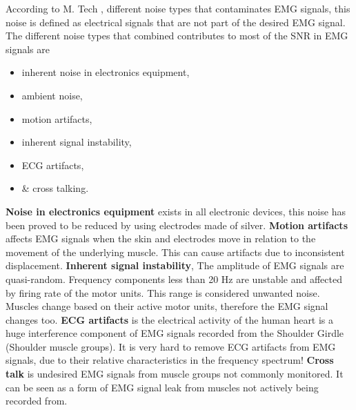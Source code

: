 \documentclass[../main.tex]{subfiles}
\begin{document}
According to M. Tech \cite{Tech2015}, different noise types that contaminates \gls{EMG} signals, this noise is defined as electrical signals that are not part of the desired EMG signal.
The different noise types that combined contributes to most of the \gls{SNR} in EMG signals are
\begin{itemize}
\item inherent noise in electronics equipment,
\item ambient noise,
\item motion artifacts,
\item inherent signal instability,
\item \gls{ECG} artifacts,
\item \& cross talking.
\end{itemize}

\textbf{Noise in electronics equipment} exists in all electronic devices, this noise has been proved to be reduced by using electrodes made of silver.
\textbf{Motion artifacts} affects EMG signals when the skin and electrodes move in relation to the movement of the underlying muscle.
This can cause artifacts due to inconsistent displacement.
\textbf{Inherent signal instability}, The amplitude of EMG signals are quasi-random.
Frequency components less than 20 Hz are unstable and affected by firing rate of the motor units. This range is considered unwanted noise. Muscles change based on their active motor units, therefore the EMG signal changes too.
\textbf{ECG artifacts} is the electrical activity of the human heart is a huge interference component of EMG signals recorded from the Shoulder Girdle (Shoulder muscle groups).
It is very hard to remove ECG artifacts from EMG signals, due to their relative characteristics in the frequency spectrum!
\textbf{Cross talk} is undesired EMG signals from muscle groups not commonly monitored.
It can be seen as a form of EMG signal leak from muscles not actively being recorded from.

\end{document}
